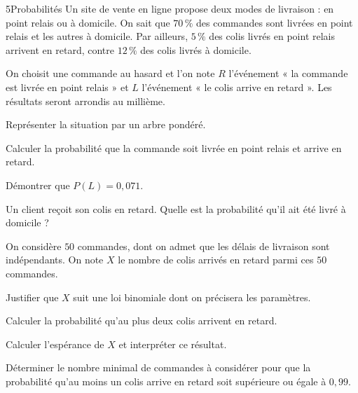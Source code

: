 

\begin{exoBac}{5}{Probabilités}
Un site de vente en ligne propose deux modes de livraison : en point relais ou à domicile. On sait que $70\,\%$ des commandes sont
livrées en point relais et les autres à domicile. Par ailleurs, $5\,\%$ des colis livrés en point relais arrivent en retard,
contre $12\,\%$ des colis livrés à domicile.

On choisit une commande au hasard et l'on note $R$ l'événement « la commande est livrée en point relais » et $L$ l'événement
« le colis arrive en retard ». Les résultats seront arrondis au millième.

\begin{questions}
  \item Représenter la situation par un arbre pondéré.
  \item Calculer la probabilité que la commande soit livrée en point relais et arrive en retard.
  \item Démontrer que $P(L)=0{,}071$.
  \item Un client reçoit son colis en retard. Quelle est la probabilité qu'il ait été livré à domicile ?
\end{questions}

On considère $50$ commandes, dont on admet que les délais de livraison sont indépendants. On note $X$ le nombre de colis arrivés en
retard parmi ces $50$ commandes.
\begin{questions}[resume]
  \item Justifier que $X$ suit une loi binomiale dont on précisera les paramètres.
  \item Calculer la probabilité qu'au plus deux colis arrivent en retard.
  \item Calculer l'espérance de $X$ et interpréter ce résultat.
\end{questions}

\begin{questions}[resume]
  \item Déterminer le nombre minimal de commandes à considérer pour que la probabilité qu'au moins un colis arrive en retard soit
    supérieure ou égale à $0{,}99$.
\end{questions}
\end{exoBac}

